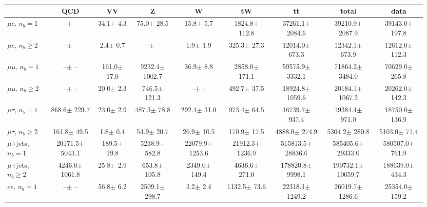 \begin{sidewaystable}[p]
    \centering
    \setlength{\tabcolsep}{0.4em}
    \renewcommand{\arraystretch}{2}
    \small
    \begin{tabular}{l|cccccc|cc}
    \hline
        & QCD & VV  & Z & W & tW & tt & total & data      \\
    \hline
    
    $\mu e$, $n_b=1$                   &       --$\pm$     -- &     34.1$\pm$    4.3 &     75.0$\pm$   28.5 &     15.8$\pm$    5.7 &   1824.8$\pm$  112.8 &  37261.1$\pm$ 2084.6 &  39210.9$\pm$ 2087.9 &  39143.0$\pm$  197.8 \\ 
    $\mu e$, $n_b\geq2$                &       --$\pm$     -- &      2.4$\pm$    0.7 &       --$\pm$     -- &      1.9$\pm$    1.9 &    325.3$\pm$   27.3 &  12014.0$\pm$  673.3 &  12342.1$\pm$  673.9 &  12612.0$\pm$  112.3 \\ 
    \hline
    $\mu\mu$, $n_b=1$                  &       --$\pm$     -- &    161.0$\pm$   17.0 &   9232.4$\pm$ 1002.7 &     36.9$\pm$    8.8 &   2858.0$\pm$  171.1 &  59575.9$\pm$ 3332.1 &  71864.2$\pm$ 3484.0 &  70629.0$\pm$  265.8 \\ 
    $\mu\mu$, $n_b\geq2$               &       --$\pm$     -- &     20.0$\pm$    2.3 &    746.5$\pm$  121.3 &       --$\pm$     -- &    492.7$\pm$   37.5 &  18924.8$\pm$ 1059.6 &  20184.1$\pm$ 1067.2 &  20262.0$\pm$  142.3 \\ 
    \hline
    $\mu\tau$, $n_b=1$                 &    868.6$\pm$  229.7 &     23.0$\pm$    2.9 &    487.3$\pm$   78.8 &    292.4$\pm$   31.0 &    973.4$\pm$   64.5 &  16739.7$\pm$  937.4 &  19384.4$\pm$  971.0 &  18750.0$\pm$  136.9 \\ 
    $\mu\tau$, $n_b\geq2$              &    161.8$\pm$   49.5 &      1.8$\pm$    0.4 &     54.9$\pm$   20.7 &     26.9$\pm$   10.5 &    170.9$\pm$   17.5 &   4888.0$\pm$  274.9 &   5304.2$\pm$  280.8 &   5103.0$\pm$   71.4 \\ 
    \hline
    $\mu$+jets, $n_b=1$                &  20171.5$\pm$ 5043.1 &    189.5$\pm$   19.8 &   5238.9$\pm$  582.8 &  22079.9$\pm$ 1253.6 &  21912.3$\pm$ 1236.9 & 515813.5$\pm$28836.6 & 585405.6$\pm$29333.0 & 580507.0$\pm$  761.9 \\ 
    $\mu$+jets, $n_b\geq2$             &   4246.0$\pm$ 1061.8 &     25.8$\pm$    2.9 &    653.8$\pm$  105.8 &   2349.0$\pm$  149.4 &   4636.6$\pm$  271.0 & 178820.8$\pm$ 9998.1 & 190732.1$\pm$10059.7 & 188639.0$\pm$  434.3 \\ 
    \hline
    $e e$, $n_b=1$                     &       --$\pm$     -- &     56.8$\pm$    6.2 &   2509.1$\pm$  298.7 &      3.2$\pm$    2.4 &   1132.5$\pm$   73.6 &  22318.1$\pm$ 1249.2 &  26019.7$\pm$ 1286.6 &  25354.0$\pm$  159.2 \\ 

\end{tabular}
\end{sidewaystable}
